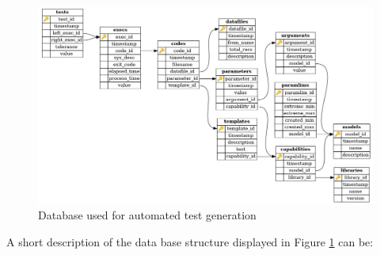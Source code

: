 \documentclass[a4paper,10pt]{article}
\begin{document}
\begin{figure}[h]
    \centering
    \includegraphics[scale=0.35]
        {../img/schema.jpg}
    \caption{Database used for automated test generation}
    \label{fig:schema}
\end{figure}

A short description of the data base structure displayed in Figure
\ref{fig:schema} can be:
\end{document}
